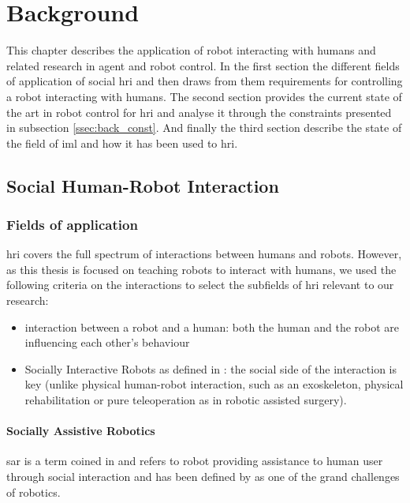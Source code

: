 \chapter{Background} \label{chap:background}

This chapter describes the application of robot interacting with humans and related research in agent and robot control. In the first section the different fields of application of social \gls{hri} and then draws from them requirements for controlling a robot interacting with humans.  The second section provides the current state of the art in robot control for \gls{hri} and analyse it through the constraints presented in subsection \ref{ssec:back_const}. And finally the third section describe the state of the field of \acrlong{iml} and how it has been used to \gls{hri}.

\section{Social Human-Robot Interaction}

\subsection{Fields of application}

\acrlong{hri} covers the full spectrum of interactions between humans and robots. However, as this thesis is focused on teaching robots to interact with humans, we used the following criteria on the interactions to select the subfields of \gls{hri} relevant to our research:
\begin{itemize}
\item interaction between a robot and a human: both the human and the robot are influencing each other's behaviour
\item Socially Interactive Robots as defined in \citep{Fong2003}: the social
    side of the interaction is key (unlike physical human-robot interaction, such as an exoskeleton, physical rehabilitation or pure teleoperation as in robotic assisted surgery).
\end{itemize}

\subsubsection{Socially Assistive Robotics}

	\gls{sar} is a term coined in \cite{feil2005defining} and refers to robot providing assistance to human user through social interaction and has been defined by \cite{tapus2007socially} as one of the grand challenges of robotics.
	
